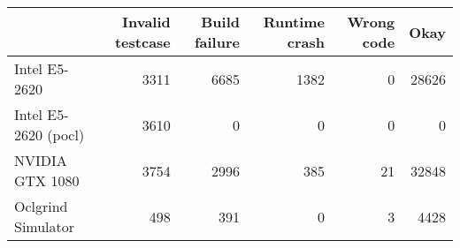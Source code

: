 \begin{tabular}{lrrrrr}
\toprule
{} &  Invalid testcase &  Build failure &  Runtime crash &  Wrong code &   Okay \\
\midrule
Intel E5-2620        &              3311 &           6685 &           1382 &           0 &  28626 \\
Intel E5-2620 (pocl) &              3610 &              0 &              0 &           0 &      0 \\
NVIDIA GTX 1080      &              3754 &           2996 &            385 &          21 &  32848 \\
Oclgrind Simulator   &               498 &            391 &              0 &           3 &   4428 \\
\bottomrule
\end{tabular}
